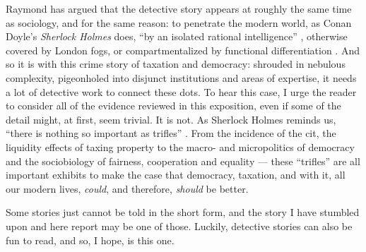 Raymond \citeauthor{Williams1992} has argued that the detective story appears at roughly the same time as sociology, and for the same reason:
to penetrate the modern world, as Conan Doyle's \emph{Sherlock Holmes} does, ``by an isolated rational intelligence'' \citep[88]{Williams1992}, otherwise covered by London fogs, or compartmentalized by functional differentiation \citep{Durkheim-1893-aa}.
And so it is with this crime story of taxation and democracy:
shrouded in nebulous complexity, pigeonholed into disjunct institutions and areas of expertise, it needs a lot of detective work to connect these dots.
To hear this case, I urge the reader to consider all of the evidence reviewed in this exposition, even if some of the detail might, at first, seem trivial.
It is not.
As Sherlock Holmes reminds us, ``there is nothing so important as trifles'' \citep[238]{Doyle1891}.
From the incidence of the \gls{cit}, the liquidity effects of taxing property to the macro- and micropolitics of democracy and the sociobiology of fairness, cooperation and equality
--- these ``trifles'' are all important exhibits to make the case that democracy, taxation, and with it, all our modern lives, \emph{could}, and therefore, \emph{should} be better.

Some stories just cannot be told in the short form, and the story I have stumbled upon and here report may be one of those.
Luckily, detective stories can also be fun to read, and so, I hope, is this one.